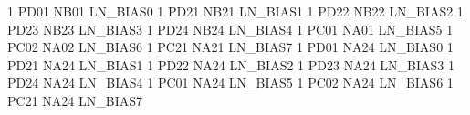 1   PD01    NB01    LN_BIAS0
1   PD21    NB21    LN_BIAS1
1   PD22    NB22    LN_BIAS2
1   PD23    NB23    LN_BIAS3
1   PD24    NB24    LN_BIAS4
1   PC01    NA01    LN_BIAS5
1   PC02    NA02    LN_BIAS6
1   PC21    NA21    LN_BIAS7
1   PD01    NA24    LN_BIAS0
1   PD21    NA24    LN_BIAS1
1   PD22    NA24    LN_BIAS2
1   PD23    NA24    LN_BIAS3
1   PD24    NA24    LN_BIAS4
1   PC01    NA24    LN_BIAS5
1   PC02    NA24    LN_BIAS6
1   PC21    NA24    LN_BIAS7
